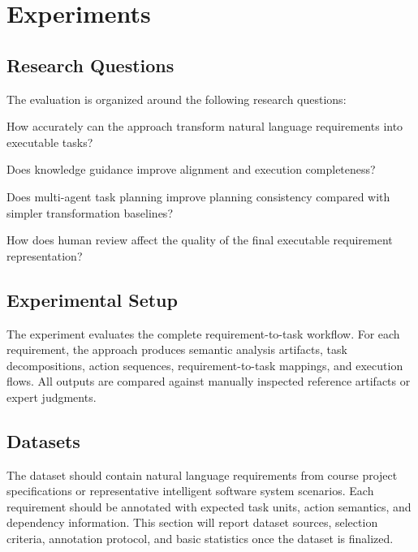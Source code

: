 \section{Experiments}
\label{experiments}

\subsection{Research Questions}
\label{sec:exp-rq}

The evaluation is organized around the following research questions:
\begin{description}[leftmargin=*,style=nextline]
  \item[RQ1] How accurately can the approach transform natural language requirements into executable tasks?
  \item[RQ2] Does knowledge guidance improve alignment and execution completeness?
  \item[RQ3] Does multi-agent task planning improve planning consistency compared with simpler transformation baselines?
  \item[RQ4] How does human review affect the quality of the final executable requirement representation?
\end{description}

\subsection{Experimental Setup}
\label{sec:exp-setup}

The experiment evaluates the complete requirement-to-task workflow.
For each requirement, the approach produces semantic analysis artifacts, task decompositions, action sequences, requirement-to-task mappings, and execution flows.
All outputs are compared against manually inspected reference artifacts or expert judgments.

\subsection{Datasets}
\label{sec:exp-datasets}

The dataset should contain natural language requirements from course project specifications or representative intelligent software system scenarios.
Each requirement should be annotated with expected task units, action semantics, and dependency information.
This section will report dataset sources, selection criteria, annotation protocol, and basic statistics once the dataset is finalized.


